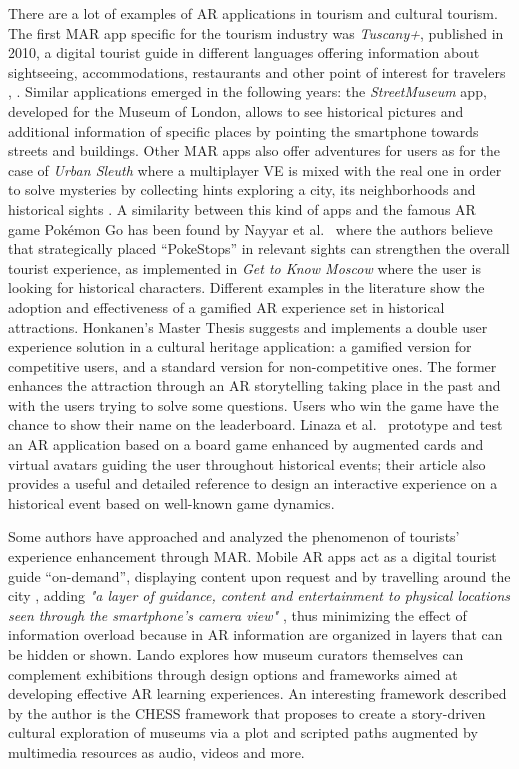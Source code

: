 There are a lot of examples of AR applications in tourism and cultural tourism. The first MAR app specific for the tourism industry was \textit{Tuscany+}, published in 2010, a digital tourist guide in different languages offering information about sightseeing, accommodations, restaurants and other point of interest for travelers \cite{kounavis_enhancing_2012}, \cite{nayyar_virtual_2018}. Similar applications emerged in the following years: the \textit{StreetMuseum} app, developed for the Museum of London, allows to see historical pictures and additional information of specific places by pointing the smartphone towards streets and buildings. Other MAR apps also offer adventures for users as for the case of \textit{Urban Sleuth} where a multiplayer VE is mixed with the real one in order to solve mysteries by collecting hints exploring a city, its neighborhoods and historical sights \cite{kounavis_enhancing_2012}. A similarity between this kind of apps and the famous AR game Pokémon Go has been found by Nayyar et al.~\cite{nayyar_virtual_2018} where the authors believe that strategically placed “PokeStops” in relevant sights can strengthen the overall tourist experience, as implemented in \textit{Get to Know Moscow} \cite{honkanen_enhancing_2018} where the user is looking for historical characters.
Different examples in the literature show the adoption and effectiveness of a gamified AR experience set in historical attractions. Honkanen's Master Thesis \cite{honkanen_enhancing_2018} suggests and implements a double user experience solution in a cultural heritage application: a gamified version for competitive users, and a standard version for non-competitive ones. The former enhances the attraction through an AR storytelling taking place in the past and with the users trying to solve some questions. Users who win the game have the chance to show their name on the leaderboard. Linaza et al.~\cite{linaza_interactive_2007} prototype and test an AR application based on a board game enhanced by augmented cards and virtual avatars guiding the user throughout historical events; their article also provides a useful and detailed reference to design an interactive experience on a historical event based on well-known game dynamics.

Some authors have approached and analyzed the phenomenon of tourists' experience enhancement through MAR. Mobile AR apps act as a digital tourist guide “on-demand”, displaying content upon request and by travelling around the city \cite{kounavis_enhancing_2012}, adding \textit{"a layer of guidance, content and entertainment to physical locations seen through the smartphone's camera view"} \cite{nayyar_virtual_2018}, thus minimizing the effect of information overload \cite{kounavis_enhancing_2012} because in AR information are organized in layers that can be hidden or shown. Lando \cite{lando_how_2017} explores how museum curators themselves can complement exhibitions through design options and frameworks aimed at developing effective AR learning experiences. An interesting framework described by the author is the CHESS framework that proposes to create a story-driven cultural exploration of museums via a plot and scripted paths augmented by multimedia resources as audio, videos and more.

